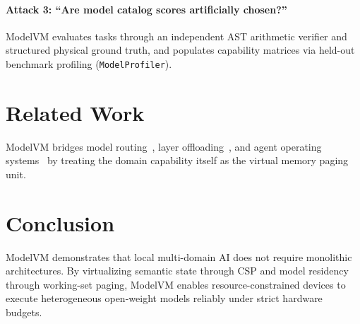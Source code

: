 \documentclass[10pt,twocolumn]{article}
\begin{document}
\paragraph{Attack 3: ``Are model catalog scores artificially chosen?''}
ModelVM evaluates tasks through an independent AST arithmetic verifier and structured physical ground truth, and populates capability matrices via held-out benchmark profiling (\texttt{ModelProfiler}).

\section{Related Work}

ModelVM bridges model routing~\cite{ong2024routellm,chen2023frugalgpt}, layer offloading~\cite{sheng2023flexgen,alwani2023llmflash}, and agent operating systems~\cite{packer2023memgpt,mei2024aios} by treating the domain capability itself as the virtual memory paging unit.

\section{Conclusion}

ModelVM demonstrates that local multi-domain AI does not require monolithic architectures. By virtualizing semantic state through CSP and model residency through working-set paging, ModelVM enables resource-constrained devices to execute heterogeneous open-weight models reliably under strict hardware budgets.



\end{document}
